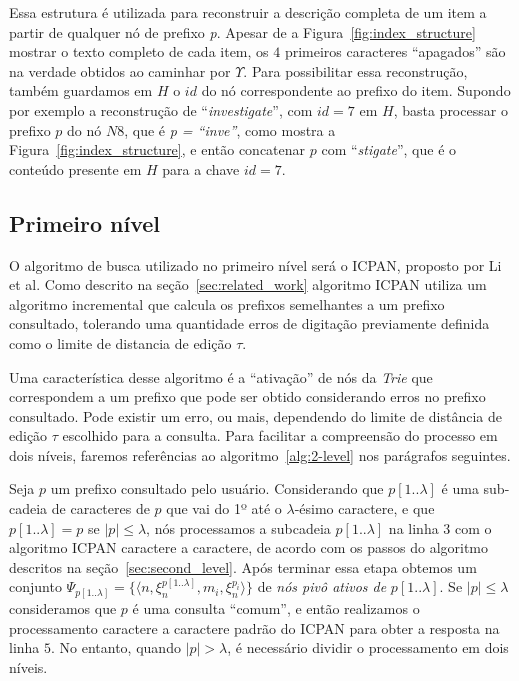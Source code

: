 Essa estrutura é utilizada para reconstruir a descrição completa de um item a partir de qualquer nó de prefixo \textit{p}. Apesar de a Figura~\ref{fig:index_structure} mostrar o texto completo de cada item, os $4$ primeiros caracteres ``apagados'' são na verdade obtidos ao caminhar por $\Upsilon$. Para possibilitar essa reconstrução, também guardamos em $H$ o $id$ do nó correspondente ao prefixo do item. Supondo por exemplo a reconstrução de ``\textit{investigate}'', com $id=7$ em $H$, basta processar o prefixo $p$ do nó $N8$, que é \textit{p = ``inve''}, como mostra a Figura~\ref{fig:index_structure}, e então concatenar $p$ com ``\textit{stigate}'', que é o conteúdo presente em $H$ para a chave $id=7$.

\subsection{Primeiro nível}
\label{sec:first-level}

O algoritmo de busca utilizado no primeiro nível será o ICPAN, proposto por Li et al. Como descrito na seção~\ref{sec:related_work} algoritmo ICPAN utiliza um algoritmo incremental que calcula os prefixos semelhantes a um prefixo consultado, tolerando uma quantidade erros de digitação previamente definida como o limite de distancia de edição $\tau$.

Uma característica desse algoritmo é a ``ativação'' de nós da \textit{Trie} que correspondem a um prefixo que pode ser obtido considerando erros no prefixo consultado. Pode existir um erro, ou mais, dependendo do limite de distância de edição $\tau$ escolhido para a consulta. Para facilitar a compreensão do processo em dois níveis, faremos referências ao algoritmo~\ref{alg:2-level} nos parágrafos seguintes.

Seja $p$ um prefixo consultado pelo usuário. Considerando que $p[1..\lambda]$ é uma sub-cadeia de caracteres de $p$ que vai do 1º até o $\lambda$-ésimo caractere, e que $p[1..\lambda] = p$ se $|p| \leq \lambda$, nós processamos a subcadeia $p[1..\lambda]$ na linha $3$ com o algoritmo ICPAN caractere a caractere, de acordo com os passos do algoritmo descritos na seção~\ref{sec:second_level}. Após terminar essa etapa obtemos um conjunto $\Psi_{p[1..\lambda]} = \{ \langle n, \xi_{n}^{p[1..\lambda]}, m_{i}, \xi_{n}^{p_{i}} \rangle \}$ de \textit{nós pivô ativos de} $p[1..\lambda]$. Se $|p| \leq \lambda$ consideramos que $p$ é uma consulta ``comum'', e então realizamos o processamento caractere a caractere padrão do ICPAN para obter a resposta na linha $5$. No entanto, quando $|p| > \lambda$, é necessário dividir o processamento em dois níveis.

